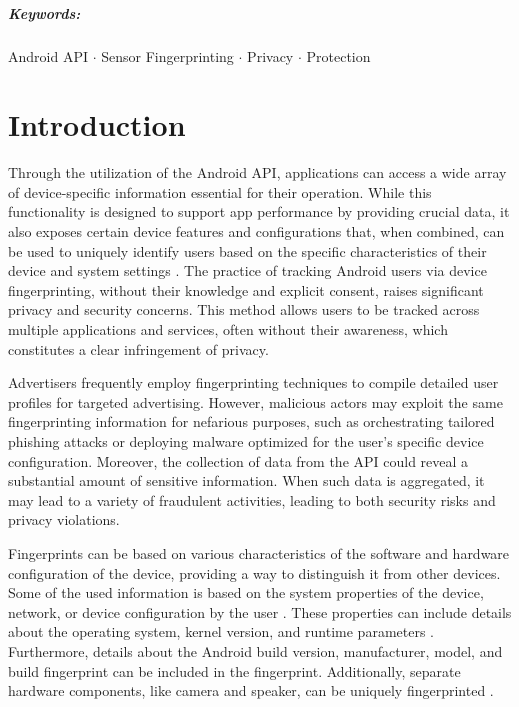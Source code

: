 \documentclass[11pt,
  oneside,openany,    %
]{scrreprt}
\begin{document}
\paragraph{Keywords:}
Android API $\cdot$
Sensor Fingerprinting $\cdot$
Privacy $\cdot$
Protection

\cleardoublepage

\chapter{Introduction}
\label{chap:introduction}

Through the utilization of the Android API, applications can access a wide array of device-specific information essential for their operation.
While this functionality is designed to support app performance by providing crucial data, it also exposes certain device features and configurations that, when combined, can be used to uniquely identify users based on the specific characteristics of their device and system settings \cite{DBLP:conf/IEEEares/PalfingerP20}.
The practice of tracking Android users via device fingerprinting, without their knowledge and explicit consent, raises significant privacy and security concerns.
This method allows users to be tracked across multiple applications and services, often without their awareness, which constitutes a clear infringement of privacy.

Advertisers frequently employ fingerprinting techniques to compile detailed user profiles for targeted advertising.
However, malicious actors may exploit the same fingerprinting information for nefarious purposes, such as orchestrating tailored phishing attacks or deploying malware optimized for the user's specific device configuration.
Moreover, the collection of data from the API could reveal a substantial amount of sensitive information.
When such data is aggregated, it may lead to a variety of fraudulent activities, leading to both security risks and privacy violations.

Fingerprints can be based on various characteristics of the software and hardware configuration of the device, providing a way to distinguish it from other devices.
Some of the used information is based on the system properties of the device, network, or device configuration by the user \cite{DBLP:journals/popets/KurtzGBRF16}. 
These properties can include details about the operating system, kernel version, and runtime parameters \cite{DBLP:journals/access/WuWWLY16}.
Furthermore, details about the Android build version, manufacturer, model, and build fingerprint can be included in the fingerprint. 
Additionally, separate hardware components, like camera and speaker, can be uniquely fingerprinted \cite{DBLP:journals/tifs/Li10, DBLP:journals/popets/DasBC18}.
\end{document}

